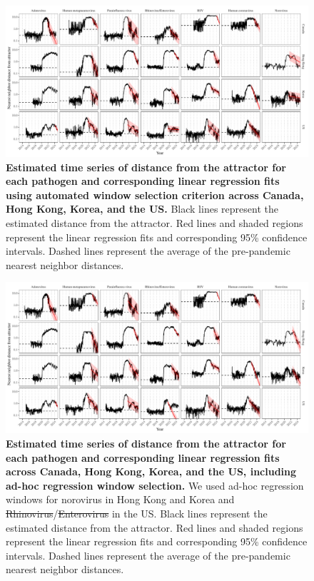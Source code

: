 \documentclass[12pt]{article}
\providecommand{\DIFaddtex}[1]{{\protect\color{blue}\uwave{#1}}} %
\providecommand{\DIFdeltex}[1]{{\protect\color{red}\sout{#1}}}                      %
\providecommand{\DIFaddFL}[1]{\DIFadd{#1}} %
\providecommand{\DIFdelFL}[1]{\DIFdel{#1}} %
\providecommand{\DIFaddbeginFL}{} %
\providecommand{\DIFaddendFL}{} %
\providecommand{\DIFdelbeginFL}{} %
\providecommand{\DIFdelendFL}{} %
\providecommand{\DIFadd}[1]{\texorpdfstring{\DIFaddtex{#1}}{#1}} %
\providecommand{\DIFdel}[1]{\texorpdfstring{\DIFdeltex{#1}}{}} %
\newcommand{\DIFscaledelfig}{0.5}
\newlength{\DIFdelgraphicswidth} %
\newlength{\DIFdelgraphicsheight} %
\newcommand{\DIFaddincludegraphics}[2][]{{\color{blue}\fbox{\DIFOincludegraphics[#1]{#2}}}} %
\newcommand{\DIFdelincludegraphics}[2][]{%
\sbox{\DIFdelgraphicsbox}{\DIFOincludegraphics[#1]{#2}}%
\settoboxwidth{\DIFdelgraphicswidth}{\DIFdelgraphicsbox} %
\settoboxtotalheight{\DIFdelgraphicsheight}{\DIFdelgraphicsbox} %
\scalebox{\DIFscaledelfig}{%
\parbox[b]{\DIFdelgraphicswidth}{\usebox{\DIFdelgraphicsbox}\\[-\baselineskip] \rule{\DIFdelgraphicswidth}{0em}}\llap{\resizebox{\DIFdelgraphicswidth}{\DIFdelgraphicsheight}{%
\setlength{\unitlength}{\DIFdelgraphicswidth}%
\begin{picture}(1,1)%
\thicklines\linethickness{2pt} %
{\color[rgb]{1,0,0}\put(0,0){\framebox(1,1){}}}%
{\color[rgb]{1,0,0}\put(0,0){\line( 1,1){1}}}%
{\color[rgb]{1,0,0}\put(0,1){\line(1,-1){1}}}%
\end{picture}%
}\hspace*{3pt}}} %
} %
\DeclareRobustCommand{\DIFaddbeginFL}{\DIFOaddbeginFL \let\includegraphics\DIFaddincludegraphics} %
\DeclareRobustCommand{\DIFaddendFL}{\DIFOaddendFL \let\includegraphics\DIFOincludegraphics} %
\DeclareRobustCommand{\DIFdelbeginFL}{\DIFOdelbeginFL \let\includegraphics\DIFdelincludegraphics} %
\DeclareRobustCommand{\DIFdelendFL}{\DIFOaddendFL \let\includegraphics\DIFOincludegraphics} %
\begin{document}
\begin{figure}[!th]
\includegraphics[width=\textwidth]{../figure4/figure4_dist_auto.pdf}
\caption{
\textbf{Estimated time series of distance from the attractor for each pathogen and corresponding linear regression fits using automated window selection criterion across Canada, Hong Kong, Korea, and the US.}
Black lines represent the estimated distance from the attractor.
Red lines and shaded regions represent the linear regression fits and corresponding 95\% confidence intervals.
Dashed lines represent the average of the pre-pandemic nearest neighbor distances.
}
\end{figure}

\pagebreak

\begin{figure}[!th]
\includegraphics[width=\textwidth]{../figure4/figure4_dist.pdf}
\caption{
\textbf{Estimated time series of distance from the attractor for each pathogen and corresponding linear regression fits across Canada, Hong Kong, Korea, and the US, including ad-hoc regression window selection.}
We used ad-hoc regression windows for norovirus in Hong Kong and Korea and \DIFdelbeginFL \DIFdelFL{Rhinovirus}\DIFdelendFL \DIFaddbeginFL \DIFaddFL{rhinovirus}\DIFaddendFL /\DIFdelbeginFL \DIFdelFL{Enterovirus }\DIFdelendFL \DIFaddbeginFL \DIFaddFL{enterovirus }\DIFaddendFL in the US.
Black lines represent the estimated distance from the attractor.
Red lines and shaded regions represent the linear regression fits and corresponding 95\% confidence intervals.
Dashed lines represent the average of the pre-pandemic nearest neighbor distances.
}
\end{figure}
\end{document}
